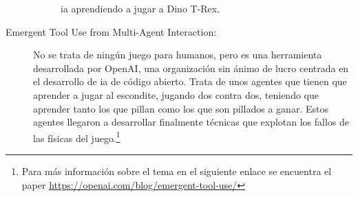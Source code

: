\begin{description}
\begin{figure}[H]
		\caption[\gls{ia} aprendiendo a jugar a Dino T-Rex.]{\gls{ia} aprendiendo a jugar a Dino T-Rex\footnotemark.}
	\end{figure}
	\item[Emergent Tool Use from Multi-Agent Interaction:] No se trata de ningún juego para humanos, pero es una herramienta desarrollada por OpenAI, una organización sin ánimo de lucro centrada en el desarrollo de \gls{ia} de código abierto. Trata de unos agentes que tienen que aprender a jugar al escondite, jugando dos contra dos, teniendo que aprender tanto los que pillan como los que son pillados a ganar. Estos agentes llegaron a desarrollar finalmente técnicas que explotan los fallos de las físicas del juego.\footnote{Para más información sobre el tema en el siguiente enlace se encuentra el paper \url{https://openai.com/blog/emergent-tool-use/}}
\end{description}
